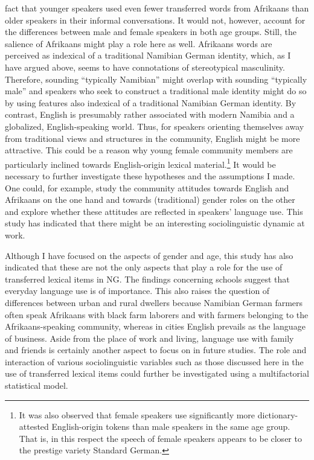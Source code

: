 \documentclass[output=paper]{langsci/langscibook}
\begin{document}
fact that younger speakers used even fewer transferred words from Afrikaans than older speakers in their informal conversations. It would not, however, account for the differences between male and female speakers in both age groups. Still, the salience of Afrikaans might play a role here as well. Afrikaans words are perceived as indexical of a traditional Namibian German identity, which, as I have argued above, seems to have connotations of stereotypical masculinity. Therefore, sounding “typically Namibian” might overlap with sounding “typically male” and speakers who seek to construct a traditional male identity might do so by using features also indexical of a traditional Namibian German identity. By contrast, English is presumably rather associated with modern Namibia and a globalized, English-speaking world. Thus, for speakers orienting themselves away from traditional views and structures in the community, English might be more attractive. This could be a reason why young female community members are particularly inclined towards English-origin lexical material.\footnote{It was also observed that female speakers use significantly more dictionary-attested English-origin tokens than male speakers in the same age group. That is, in this respect the speech of female speakers appears to be closer to the prestige variety Standard German.} It would be necessary to further investigate these hypotheses and the assumptions I made. One could, for example, study the community attitudes towards English and Afrikaans on the one hand and towards (traditional) gender roles on the other and explore whether these attitudes are reflected in speakers’ language use. This study has indicated that there might be an interesting sociolinguistic dynamic at work.

Although I have focused on the aspects of gender and age, this study has also indicated that these are not the only aspects that play a role for the use of transferred lexical items in NG. The findings concerning schools suggest that everyday language use is of importance. This also raises the question of differences between urban and rural dwellers because Namibian German farmers often speak Afrikaans with black farm laborers and with farmers belonging to the Afrikaans-speaking community, whereas in cities English prevails as the language of business. Aside from the place of work and living, language use with family and friends is certainly another aspect to focus on in future studies. The role and interaction of various sociolinguistic variables such as those discussed here in the use of transferred lexical items could further be investigated using a multifactorial statistical model.
\end{document}
